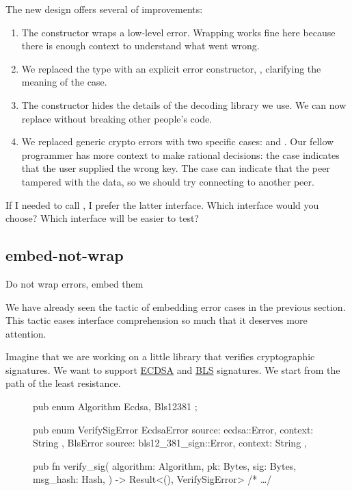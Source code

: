 \documentclass{article}
\begin{document}
The new design offers several of improvements:
\begin{enumerate}
  \item
    The  constructor wraps a low-level  error.
    Wrapping works fine here because there is enough context to understand what went wrong.
  \item
    We replaced the  type with an explicit error constructor, , clarifying the meaning of the  case.
  \item
    The  constructor hides the details of the decoding library we use.
    We can now replace  without breaking other people's code.
  \item
    We replaced generic crypto errors with two specific cases:  and .
    Our fellow programmer has more context to make rational decisions: the  case indicates that the user supplied the wrong key.
    The  case can indicate that the peer tampered with the data, so we should try connecting to another peer.
\end{enumerate}

If I needed to call , I prefer the latter interface.
Which interface would you choose?
Which interface will be easier to test?

\subsection{embed-not-wrap}{Do not wrap errors, embed them}

We have already seen the tactic of embedding error cases in the previous section.
This tactic eases interface comprehension so much that it deserves more attention.

Imagine that we are working on a little library that verifies cryptographic signatures.
We want to support \href{https://en.wikipedia.org/wiki/Elliptic_Curve_Digital_Signature_Algorithm}{ECDSA} and \href{https://en.wikipedia.org/wiki/BLS_digital_signature}{BLS} signatures.
We start from the path of the least resistance.

\begin{figure}
\begin{code}[bad]
pub enum Algorithm { Ecdsa, Bls12381 };

pub enum VerifySigError {
  EcdsaError { source: ecdsa::Error, context: String },
  BlsError { source: bls12_381_sign::Error, context: String },
}

pub fn verify_sig(
  algorithm: Algorithm,
  pk: Bytes,
  sig: Bytes,
  msg_hash: Hash,
) -> Result<(), VerifySigError> { /* \ldots  */ }
\end{code}
\end{figure}
\end{document}
